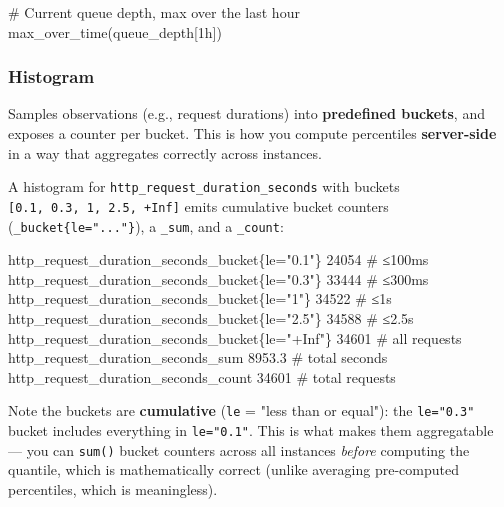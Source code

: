 \documentclass[11pt]{article}
\newenvironment{Shaded}{\begin{snugshade}}{\end{snugshade}}
\newcommand{\CommentTok}[1]{\textcolor[rgb]{0.48,0.49,0.49}{#1}}
\newcommand{\DecValTok}[1]{\textcolor[rgb]{0.96,0.45,0.00}{#1}}
\newcommand{\FloatTok}[1]{\textcolor[rgb]{0.96,0.45,0.00}{#1}}
\newcommand{\NormalTok}[1]{\textcolor[rgb]{0.81,0.81,0.76}{#1}}
\newcommand{\OperatorTok}[1]{\textcolor[rgb]{0.81,0.81,0.76}{#1}}
\newcommand{\StringTok}[1]{\textcolor[rgb]{0.96,0.31,0.31}{#1}}
\begin{document}

\begin{Shaded}
\begin{Highlighting}[]
\NormalTok{\# Current queue depth, max over the last hour}
\NormalTok{max\_over\_time(queue\_depth[1h])}
\end{Highlighting}
\end{Shaded}

\subsubsection{Histogram}\label{histogram}

Samples observations (e.g., request durations) into \textbf{predefined buckets}, and exposes a counter per bucket. This is how you compute percentiles \textbf{server-side} in a way that aggregates correctly across instances.

A histogram for \texttt{http\_request\_duration\_seconds} with buckets \texttt{{[}0.1,\ 0.3,\ 1,\ 2.5,\ +Inf{]}} emits cumulative bucket counters (\texttt{\_bucket\{le="..."\}}), a \texttt{\_sum}, and a \texttt{\_count}:


\begin{Shaded}
\begin{Highlighting}[]
\NormalTok{http\_request\_duration\_seconds\_bucket\{le}\OperatorTok{=}\StringTok{"0.1"}\NormalTok{\}   }\DecValTok{24054}   \CommentTok{\# ≤100ms}
\NormalTok{http\_request\_duration\_seconds\_bucket\{le}\OperatorTok{=}\StringTok{"0.3"}\NormalTok{\}   }\DecValTok{33444}   \CommentTok{\# ≤300ms}
\NormalTok{http\_request\_duration\_seconds\_bucket\{le}\OperatorTok{=}\StringTok{"1"}\NormalTok{\}     }\DecValTok{34522}   \CommentTok{\# ≤1s}
\NormalTok{http\_request\_duration\_seconds\_bucket\{le}\OperatorTok{=}\StringTok{"2.5"}\NormalTok{\}   }\DecValTok{34588}   \CommentTok{\# ≤2.5s}
\NormalTok{http\_request\_duration\_seconds\_bucket\{le}\OperatorTok{=}\StringTok{"+Inf"}\NormalTok{\}  }\DecValTok{34601}   \CommentTok{\# all requests}
\NormalTok{http\_request\_duration\_seconds\_sum                 }\FloatTok{8953.3}  \CommentTok{\# total seconds}
\NormalTok{http\_request\_duration\_seconds\_count               }\DecValTok{34601}   \CommentTok{\# total requests}
\end{Highlighting}
\end{Shaded}

Note the buckets are \textbf{cumulative} (\texttt{le} = "less than or equal"): the \texttt{le="0.3"} bucket includes everything in \texttt{le="0.1"}. This is what makes them aggregatable --- you can \texttt{sum()} bucket counters across all instances \emph{before} computing the quantile, which is mathematically correct (unlike averaging pre-computed percentiles, which is meaningless).
\end{document}
